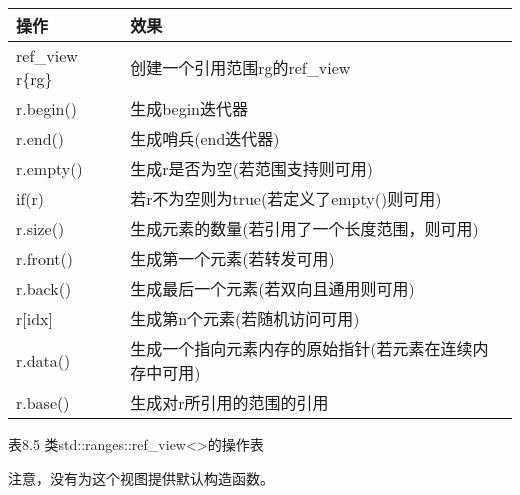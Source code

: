 \begin{longtable}[c]{|l|l|}
\hline
\textbf{操作} & \textbf{效果}                                                \\ \hline
\endfirsthead
%
\endhead
%
ref\_view r\{rg\}  & 创建一个引用范围rg的ref\_view                 \\ \hline
r.begin()          & 生成begin迭代器                                  \\ \hline
r.end()            & 生成哨兵(end迭代器)                             \\ \hline
r.empty()          & 生成r是否为空(若范围支持则可用) \\ \hline
if(r)              & 若r不为空则为true(若定义了empty()则可用)        \\ \hline
r.size() & 生成元素的数量(若引用了一个长度范围，则可用)                            \\ \hline
r.front()          & 生成第一个元素(若转发可用)              \\ \hline
r.back()           & 生成最后一个元素(若双向且通用则可用) \\ \hline
r{[}idx{]}         & 生成第n个元素(若随机访问可用)            \\ \hline
r.data() & 生成一个指向元素内存的原始指针(若元素在连续内存中可用) \\ \hline
r.base()           & 生成对r所引用的范围的引用               \\ \hline
\end{longtable}

\begin{center}
表8.5 类std::ranges::ref\_view<>的操作表
\end{center}

注意，没有为这个视图提供默认构造函数。


